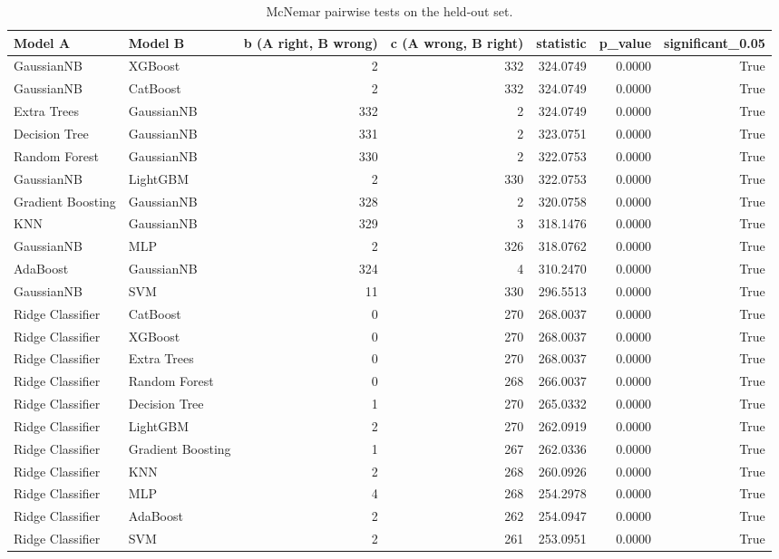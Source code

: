 \begin{table}
\caption{McNemar pairwise tests on the held-out set.}
\label{tab:mcnemar}
\begin{tabular}{llrrrrr}
\toprule
Model A & Model B & b (A right, B wrong) & c (A wrong, B right) & statistic & p\_value & significant\_0.05 \\
\midrule
GaussianNB & XGBoost & 2 & 332 & 324.0749 & 0.0000 & True \\
GaussianNB & CatBoost & 2 & 332 & 324.0749 & 0.0000 & True \\
Extra Trees & GaussianNB & 332 & 2 & 324.0749 & 0.0000 & True \\
Decision Tree & GaussianNB & 331 & 2 & 323.0751 & 0.0000 & True \\
Random Forest & GaussianNB & 330 & 2 & 322.0753 & 0.0000 & True \\
GaussianNB & LightGBM & 2 & 330 & 322.0753 & 0.0000 & True \\
Gradient Boosting & GaussianNB & 328 & 2 & 320.0758 & 0.0000 & True \\
KNN & GaussianNB & 329 & 3 & 318.1476 & 0.0000 & True \\
GaussianNB & MLP & 2 & 326 & 318.0762 & 0.0000 & True \\
AdaBoost & GaussianNB & 324 & 4 & 310.2470 & 0.0000 & True \\
GaussianNB & SVM & 11 & 330 & 296.5513 & 0.0000 & True \\
Ridge Classifier & CatBoost & 0 & 270 & 268.0037 & 0.0000 & True \\
Ridge Classifier & XGBoost & 0 & 270 & 268.0037 & 0.0000 & True \\
Ridge Classifier & Extra Trees & 0 & 270 & 268.0037 & 0.0000 & True \\
Ridge Classifier & Random Forest & 0 & 268 & 266.0037 & 0.0000 & True \\
Ridge Classifier & Decision Tree & 1 & 270 & 265.0332 & 0.0000 & True \\
Ridge Classifier & LightGBM & 2 & 270 & 262.0919 & 0.0000 & True \\
Ridge Classifier & Gradient Boosting & 1 & 267 & 262.0336 & 0.0000 & True \\
Ridge Classifier & KNN & 2 & 268 & 260.0926 & 0.0000 & True \\
Ridge Classifier & MLP & 4 & 268 & 254.2978 & 0.0000 & True \\
Ridge Classifier & AdaBoost & 2 & 262 & 254.0947 & 0.0000 & True \\
Ridge Classifier & SVM & 2 & 261 & 253.0951 & 0.0000 & True \\

\end{tabular}
\end{table}
